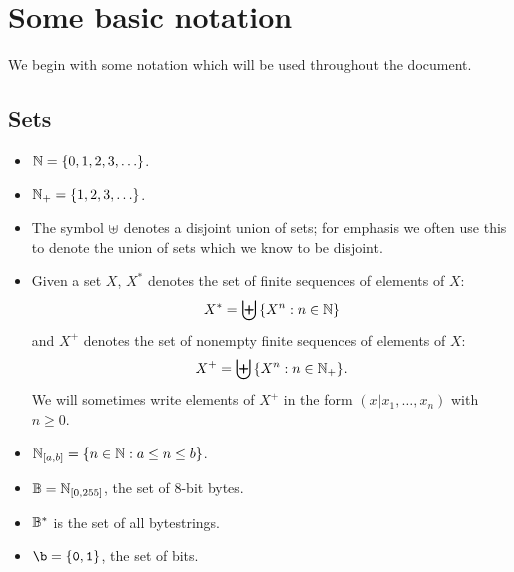 \section{Some basic notation}
\label{sec:notation}
We begin with some notation which will be used throughout the document.

\subsection{Sets}
\label{sec:notation-sets}
\begin{itemize}
    
  \item $\mathbb{N} = \{0,1,2,3,\ldots\}$.%

  \item $\mathbb{N}_{+} = \{1,2,3,\ldots\}$.%

  \item The symbol $\uplus$ denotes a disjoint union of sets;  for emphasis we often use this
    to denote the union of sets which we know to be disjoint.%

  \item Given a set $X$, $X^*$ denotes the set of finite sequences of elements of $X$:
    $$
    X^* = \biguplus{\{X^n: n \in \mathbb{N}\}}
    $$%
    and $X^+$ denotes the set of nonempty finite sequences of elements of $X$:
    $$
    X^+ = \biguplus{\{X^n: n \in \mathbb{N}_{+}\}}.
    $$
    We will sometimes write elements of $X^+$ in the form $(x|x_1,\ldots,x_n)$ with $n \geq 0$.
 
 \item $\mathbb{N}_{[a,b]} = \{n \in \mathbb{N}: a \leq n \leq b\}$.%

  \item $\mathbb{B} = \mathbb{N}_{[0,255]}$, the set of 8-bit bytes.%

  \item $\mathbb{B}^*$ is the set of all bytestrings.%

  \item $\b = \{\mathtt{0}, \mathtt{1}\}$, the set of bits.%


\end{itemize}
